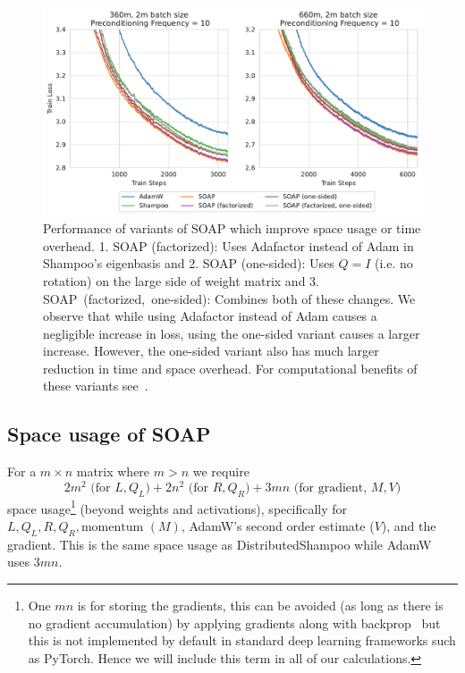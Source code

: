 \documentclass{article} %
\begin{document}
\begin{figure}[!h]
	\centering
	\includegraphics[width=1\linewidth]{figures/factor.pdf}
	\caption{Performance of variants of SOAP which improve space usage or time overhead. 1. SOAP (factorized): Uses Adafactor instead of Adam in Shampoo's eigenbasis and 2. SOAP (one-sided): Uses $Q = I$ (i.e. no rotation) on the large side of weight matrix and 3. SOAP~(factorized,~one-sided): Combines both of these changes. We observe that while using Adafactor instead of Adam causes a negligible increase in loss, using the one-sided variant causes a larger increase. However, the one-sided variant also has much larger reduction in time and space overhead. For computational benefits of these variants see~.}
	\label{fig:factor}
\end{figure}



\subsection{Space usage of SOAP}
\label{app:adafactor}



For a $m \times n$ matrix where $m > n$ we require $$2m^2\text{ (for $L, Q_L$)}+2n^2\text{ (for $R, Q_R$)}+3mn\text{ (for gradient, $M, V$)}$$ space usage\footnote{One $mn$ is for storing the gradients, this can be avoided (as long as there is no gradient accumulation) by applying gradients along with backprop~\citep{lomo} but this is not implemented by default in standard deep learning frameworks such as PyTorch. Hence we will include this term in all of our calculations.} (beyond weights and activations), specifically for $L, Q_L, R, Q_R, \text{momentum }(M)$, AdamW's second order estimate ($V$), and the gradient. This is the same space usage as DistributedShampoo while AdamW uses $3mn$.
\end{document}

